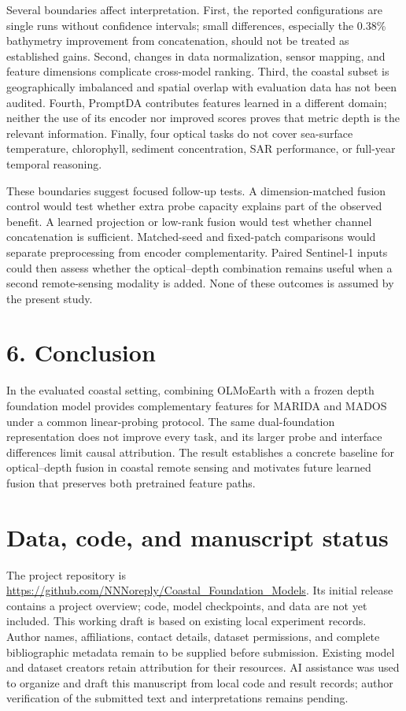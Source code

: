 \documentclass[
  10pt,
  english,
]{article}
\begin{document}
Several boundaries affect interpretation. First, the reported
configurations are single runs without confidence intervals; small
differences, especially the 0.38\% bathymetry improvement from
concatenation, should not be treated as established gains. Second,
changes in data normalization, sensor mapping, and feature dimensions
complicate cross-model ranking. Third, the coastal subset is
geographically imbalanced and spatial overlap with evaluation data has
not been audited. Fourth, PromptDA contributes features learned in a
different domain; neither the use of its encoder nor improved scores
proves that metric depth is the relevant information. Finally, four
optical tasks do not cover sea-surface temperature, chlorophyll,
sediment concentration, SAR performance, or full-year temporal
reasoning.

These boundaries suggest focused follow-up tests. A dimension-matched
fusion control would test whether extra probe capacity explains part of
the observed benefit. A learned projection or low-rank fusion would test
whether channel concatenation is sufficient. Matched-seed and
fixed-patch comparisons would separate preprocessing from encoder
complementarity. Paired Sentinel-1 inputs could then assess whether the
optical--depth combination remains useful when a second remote-sensing
modality is added. None of these outcomes is assumed by the present
study.

\hypertarget{conclusion}{%
\section{6. Conclusion}\label{conclusion}}

In the evaluated coastal setting, combining OLMoEarth with a frozen
depth foundation model provides complementary features for MARIDA and
MADOS under a common linear-probing protocol. The same dual-foundation
representation does not improve every task, and its larger probe and
interface differences limit causal attribution. The result establishes a
concrete baseline for optical--depth fusion in coastal remote sensing
and motivates future learned fusion that preserves both pretrained
feature paths.

\hypertarget{data-code-and-manuscript-status}{%
\section{Data, code, and manuscript
status}\label{data-code-and-manuscript-status}}

The project repository is
\url{https://github.com/NNNoreply/Coastal_Foundation_Models}. Its
initial release contains a project overview; code, model checkpoints,
and data are not yet included. This working draft is based on existing
local experiment records. Author names, affiliations, contact details,
dataset permissions, and complete bibliographic metadata remain to be
supplied before submission. Existing model and dataset creators retain
attribution for their resources. AI assistance was used to organize and
draft this manuscript from local code and result records; author
verification of the submitted text and interpretations remains pending.
\end{document}
